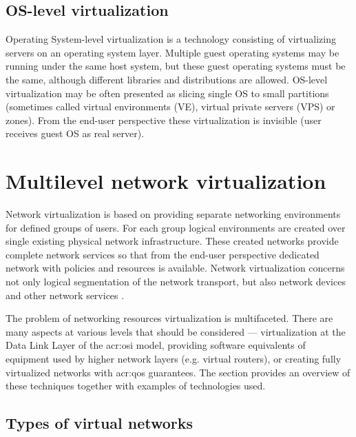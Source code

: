 \documentclass[11pt,openany]{book}
\begin{document}
      \subsection{OS-level virtualization}

        Operating System-level virtualization is a technology consisting of virtualizing servers on an operating system
        layer.  Multiple guest operating systems may be running under the same host system, but these guest operating
        systems must be the same,
        although different libraries and distributions are allowed. OS-level virtualization may be often presented as
        slicing single OS to small partitions (sometimes called virtual environments (VE), virtual private servers (VPS)
        or zones). From the end-user perspective these virtualization is invisible (user receives guest OS as real
        server).



    \section{Multilevel network virtualization}
    \label{sec:ctx:multi}

      Network virtualization is based on providing separate networking environments for defined groups of users. For
      each group logical environments are created over single existing physical network infrastructure. These created
      networks provide complete network services so that from the end-user perspective dedicated network with policies
      and resources is available. Network virtualization concerns not only logical segmentation of the network
      transport, but also network devices and other network services \cite{network_virt}.

      The problem of networking resources virtualization is multifaceted. There are many aspects at various levels that
      should be considered --- virtualization at the Data Link Layer of the \gls{acr:osi} model, providing software
      equivalents of equipment used by higher network layers (e.g. virtual routers), or creating fully virtualized
      networks with \gls{acr:qos} guarantees. The section provides an overview of these techniques together with
      examples of technologies used.


      \subsection{Types of virtual networks}
\end{document}

